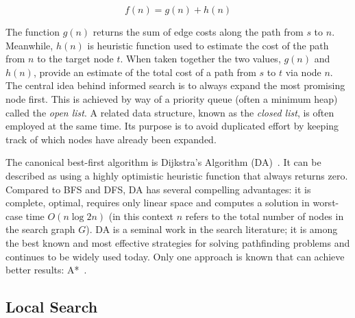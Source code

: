 \begin{equation}
f(n) = g(n) + h(n)
\end{equation}

The function $g(n)$ returns the sum of edge costs along the path from $s$ to $n$.
Meanwhile, $h(n)$ is heuristic function used to estimate the cost of the path 
from $n$ to the target node $t$. When taken together the two values, 
$g(n)$ and $h(n)$, provide an estimate of the total cost of a path from $s$ to 
$t$ via node $n$.
The central idea behind informed search is to always expand the most promising node 
first. This is achieved by way of a priority queue (often a minimum heap) 
called the \emph{open list}. A related data structure, known as the \emph{closed list},
is often employed at the same time. Its purpose is to avoid duplicated effort by keeping
track of which nodes have already been expanded. 

The canonical best-first algorithm is Dijkstra's Algorithm (DA)~\cite{dijkstra59}. It can be 
described as using a highly optimistic heuristic function that always returns zero.
Compared to BFS and DFS, DA has several compelling advantages: it is complete, optimal,
requires only linear space and computes a solution in worst-case time $O(n\log{2}{n})$ 
(in this context $n$ refers to the total number of nodes in the search graph $G$).
DA is a seminal work in the search literature; it is among the best known and most
effective strategies for solving pathfinding problems and continues to be widely
used today. Only one approach is known that can achieve better results: A*~\cite{hart68}.


\subsection{Local Search}
\label{cha::lit::search::local}

